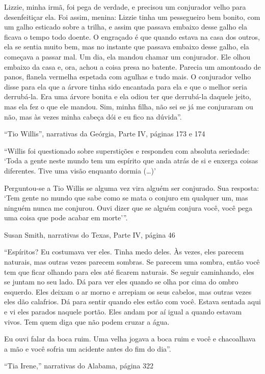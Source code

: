 Lizzie, minha irmã, foi pega de verdade, e precisou um conjurador velho
para desenfeitiçar ela. Foi assim, menina: Lizzie tinha um pessegueiro
bem bonito, com um galho esticado sobre a trilha, e assim que passava
embaixo desse galho ela ficava o tempo todo doente. O engraçado é que
quando estava na casa dos outros, ela se sentia muito bem, mas no
instante que passava embaixo desse galho, ela começava a passar mal. Um
dia, ela mandou chamar um conjurador. Ele olhou embaixo da casa e, ora,
achou a coisa presa no batente. Parecia um amontoado de panos, flanela
vermelha espetada com agulhas e tudo mais. O conjurador velho disse para
ela que a árvore tinha sido encantada para ela e que o melhor seria
derrubá-la. Era uma árvore bonita e ela odiou ter que derrubá-la daquele
jeito, mas ela fez o que ele mandou. Sim, minha filha, não sei se já me
conjuraram ou não, mas às vezes minha cabeça dói e eu fico na dúvida''.

``Tio Willis'', narrativas da Geórgia, Parte IV, páginas 173 e 174

``Willis foi questionado sobre superstições e respondeu com absoluta
seriedade: `Toda a gente neste mundo tem um espírito que anda atrás de
si e enxerga coisas diferentes. Tive uma visão enquanto dormia
(\ldots{})'

Perguntou-se a Tio Willis se alguma vez vira alguém ser conjurado. Sua
resposta: `Tem gente no mundo que sabe como se mata o conjuro em
qualquer um, mas ninguém nunca me conjurou. Ouvi dizer que se alguém
conjura você, você pega uma coisa que pode acabar em morte'''.

Susan Smith, narrativas do Texas, Parte IV, página 46

``Espíritos? Eu costumava ver eles. Tinha medo deles. Às vezes, eles
parecem naturais, mas outras vezes parecem sombras. Se parecem uma
sombra, então você tem que ficar olhando para eles até ficarem naturais.
Se seguir caminhando, eles se juntam no seu lado. Dá para ver eles
quando se olha por cima do ombro esquerdo. Eles deixam o ar morno e
arrepiam os seus cabelos, mas outras vezes eles dão calafrios. Dá para
sentir quando eles estão com você. Estava sentada aqui e vi eles parados
naquele portão. Eles andam por aí igual a quando estavam vivos. Tem quem
diga que não podem cruzar a água.

Eu ouvi falar da boca ruim. Uma velha jogava a boca ruim e você e
chacoalhava a mão e você sofria um acidente antes do fim do dia''.

``Tia Irene,'' narrativas do Alabama, página 322

